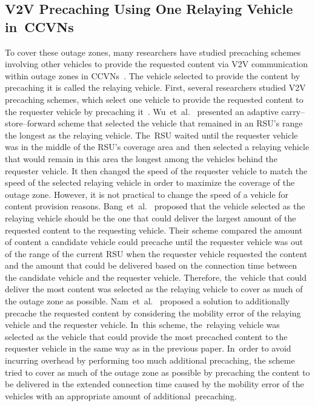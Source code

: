 \documentclass[sensors,aricle,accept,pdftex,moreauthors]{Definitions/mdpi}
\begin{document}
\subsection{V2V Precaching Using One Relaying Vehicle in~CCVNs}
To cover these outage zones, many researchers have studied precaching schemes involving other vehicles to provide the requested content via V2V communication within outage zones in CCVNs~\cite{Wu2013, Bang2020, Nam2022, Ahmed2018, Guo2017}.
The vehicle selected to provide the content by precaching it is called the relaying vehicle.
First, several researchers studied V2V precaching schemes, which select one vehicle to provide the requested content to the requester vehicle by precaching it~\cite{Wu2013, Bang2020, Nam2022}.
Wu~et~al.~\cite{Wu2013} presented an adaptive carry--store--forward scheme that selected the vehicle that remained in an RSU's range the longest as the relaying vehicle. The~RSU waited until the requester vehicle was in the middle of the RSU's coverage area and~then selected a relaying vehicle that would remain in this area the longest among the vehicles behind the requester vehicle. It then changed the speed of the requester vehicle to match the speed of the selected relaying vehicle in order to maximize the coverage of the outage zone. However, it is not practical to change the speed of a vehicle for content provision reasons.
Bang~et~al.~\cite{Bang2020} proposed that the vehicle selected as the relaying vehicle should be the one that could deliver the largest amount of the requested content to the requesting vehicle. Their scheme compared the amount of content a candidate vehicle could precache until the requester vehicle was out of the range of the current RSU when the requester vehicle requested the content and the amount that could be delivered based on the connection time between the candidate vehicle and the requester vehicle. Therefore, the~vehicle that could deliver the most content was selected as the relaying vehicle to cover as much of the outage zone as possible.
Nam~et~al.~\cite{Nam2022} proposed a solution to additionally precache the requested content by considering the mobility error of the relaying vehicle and the requester vehicle. In~this scheme, the~relaying vehicle was selected as the vehicle that could provide the most precached content to the requester vehicle in the same way as in the previous paper. In~order to avoid incurring overhead by performing too much additional precaching, the scheme tried to cover as much of the outage zone as possible by precaching the content to be delivered in the extended connection time caused by the mobility error of the vehicles with an appropriate amount of additional~precaching.
\end{document}
